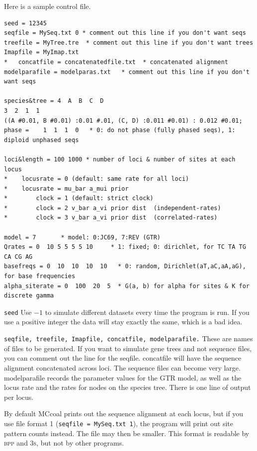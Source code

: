 \documentclass[a4paper]{book}
\numberwithin{equation}{section} \renewcommand{\baselinestretch}{0.55}
\begin{document}
Here is a sample control file.
\begin{verbatim}
seed = 12345
seqfile = MySeq.txt 0 * comment out this line if you don't want seqs
treefile = MyTree.tre  * comment out this line if you don't want trees
Imapfile = MyImap.txt
*   concatfile = concatenatedfile.txt  * concatenated alignment
modelparafile = modelparas.txt   * comment out this line if you don't want seqs

species&tree = 4  A  B  C  D
3  2  1  1
((A #0.01, B #0.01) :0.01 #.01, (C, D) :0.011 #0.01) : 0.012 #0.01;
phase =    1  1  1  0   * 0: do not phase (fully phased seqs), 1: diploid unphased seqs

loci&length = 100 1000 * number of loci & number of sites at each locus
*    locusrate = 0 (default: same rate for all loci)
*    locusrate = mu_bar a_mui prior
*        clock = 1 (default: strict clock)
*        clock = 2 v_bar a_vi prior dist  (independent-rates)
*        clock = 3 v_bar a_vi prior dist  (correlated-rates)

model = 7       * model: 0:JC69, 7:REV (GTR)
Qrates = 0  10 5 5 5 5 10     * 1: fixed; 0: dirichlet, for TC TA TG CA CG AG
basefreqs = 0  10  10  10  10   * 0: random, Dirichlet(aT,aC,aA,aG), for base frequencies
alpha_siterate = 0  100  20  5  * G(a, b) for alpha for sites & K for discrete gamma
\end{verbatim}

\texttt{seed} Use $-1$ to simulate different datasets every time the
program is run.  If you use a positive integer the data will stay
exactly the same, which is a bad idea.

\texttt{seqfile, treefile, Imapfile, concatfile, modelparafile.}
These are names of files to be generated.  If you want to simulate
gene trees and not sequence files, you can comment out the line for
the seqfile.  concatfile will have the sequence alignment concatenated
across loci.  The sequence files can become very large.  modelparafile
records the parameter values for the GTR model, as well as the locus
rate and the rates for nodes on the species tree.  There is one line
of output per locus.

By default MCcoal prints out the sequence alignment at each locus, but
if you use file format 1 (\texttt{seqfile = MySeq.txt 1}), the program
will print out site pattern counts instead. The file may then be
smaller.  This format is readable by \textsc{bpp} and \textsc{3s}, but
not by other programs.
\end{document}
